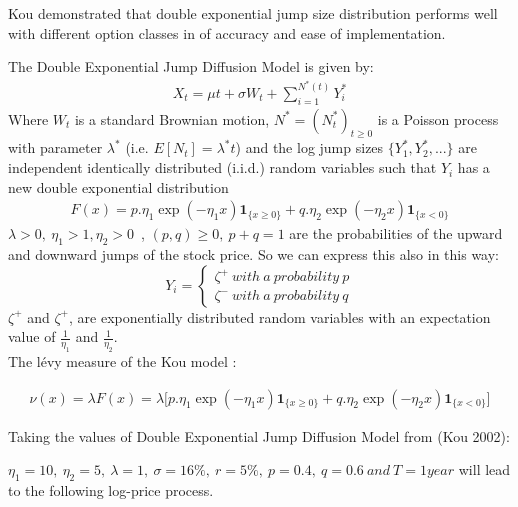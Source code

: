 \documentclass[12pt]{report}
\begin{document}
Kou demonstrated that double exponential jump size distribution performs well with different option classes  in  of accuracy and ease of implementation.

The Double Exponential Jump Diffusion Model is given by: 
\begin{gather}
X_t = \mu t+\sigma W_t+\sum_{i=1}^{N^*(t)} Y^*_i
\end{gather}
Where $W_t$ is a standard Brownian motion, $N^* =(N^*_t)_{t \geqslant 0}$ is a Poisson process with parameter $\lambda^*$ (i.e. $E[N_t] = \lambda^* t$) and the log jump sizes $\{Y^*_1 , Y^*_2 , ... \}$ are
independent identically distributed (i.i.d.) random variables such that $Y_i$ has a new double exponential distribution 
\begin{gather}
F(x)= p.\eta_1 \exp \left( -\eta_1 x \right) \mathbf{1}_{\{x\geqslant 0\}}+ q .\eta_2 \exp \left( -\eta_2 x \right) \mathbf{1}_{\{x < 0\}}
\end{gather}
$\lambda > 0,~ \eta_1 > 1, \eta_2 > 0$~,  
$(p,q) \geqslant 0,~ p+q=1$ are the probabilities of the upward and downward jumps of the stock price. So we can
express this also in this way:\\

         \[Y_i = \begin{cases} 
  \zeta^+ ~ with~ a~ probability ~ p \\
         \zeta^-  ~with ~ a ~ probability ~ q
         \end{cases}
          \]
$\zeta^+$ and $\zeta^+$, are exponentially distributed random variables with an expectation value of $\frac{1}{\eta_1}$ and $\frac{1}{\eta_2}$.\\

The lévy measure of the Kou model :

\begin{gather}
 \nu(x)=\lambda F(x)=\lambda \big[ p.\eta_1 \exp \left( -\eta_1 x \right) \mathbf{1}_{\{x\geqslant 0\}}+ q .\eta_2 \exp \left( -\eta_2 x \right) \mathbf{1}_{\{x < 0\}}\big]
\end{gather}

Taking the values of Double Exponential Jump Diffusion Model  from (Kou 2002):

$ \eta_1= 10,~\eta_2= 5,~\lambda=1,~\sigma= 16\%,~r=5\%,~ p=0.4,~ q=0.6 ~ and ~T=1 year $ will lead to the following log-price process.
\end{document}

